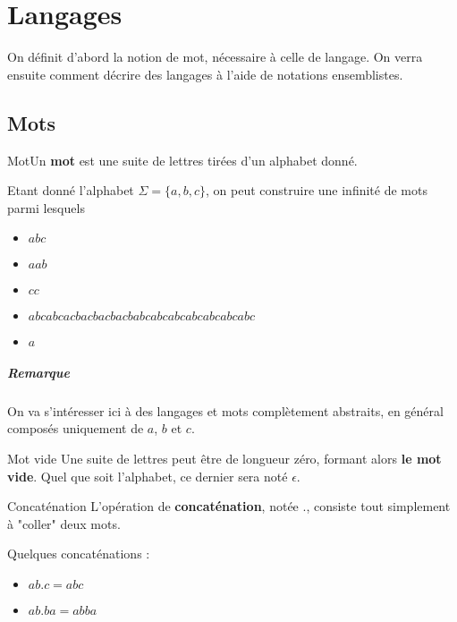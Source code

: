
\chapter{Langages}
\label{langages}

On définit d'abord la notion de mot, nécessaire à celle de langage. On verra ensuite comment décrire des langages à l'aide de notations ensemblistes.

\section{Mots}

\begin{definition}{Mot}{}Un \textbf{mot} est une suite de lettres tirées d'un alphabet donné.
\end{definition}

\begin{example}
Etant donné l'alphabet $\Sigma = \{a,b,c\}$, on peut construire une infinité de mots parmi lesquels 

\begin{itemize}
    \item $abc$
    \item $aab$
    \item $cc$
    \item $abcabcacbacbacbacbabcabcabcabcabcabcabc$
    \item $a$
\end{itemize}

\end{example}


\paragraph{Remarque} On va s'intéresser ici à des langages et mots complètement abstraits, en général composés uniquement de $a$, $b$ et $c$.

\begin{definition}{Mot vide}{}
Une suite de lettres peut être de longueur zéro, formant alors \textbf{le mot vide}. Quel que soit l'alphabet, ce dernier sera noté $\epsilon$.
\end{definition}

\begin{definition}{Concaténation}{}
\label{concat}
L'opération de \textbf{concaténation}, notée $.$, consiste tout simplement à "coller" deux mots.
\end{definition}

\begin{example}{Quelques concaténations :}

\begin{itemize}
    \item $ab.c = abc$
    \item $ab.ba = abba$
\end{itemize}
\end{example}

